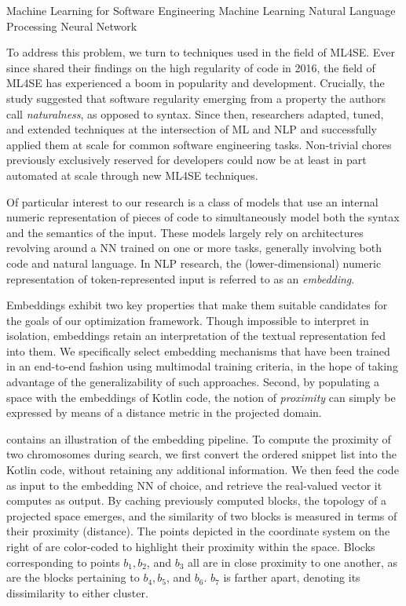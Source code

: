  {Machine Learning for Software Engineering}
 {Machine Learning}
 {Natural Language Processing}
 {Neural Network}

To address this problem, we turn to techniques used in the field
of \Gls{ML4SE}.
Ever since \citet{hindle2016naturalness} shared their findings on the
high regularity of code in 2016, the field of \gls{ML4SE} has experienced a boom
in popularity and development.
Crucially, the study suggested that software regularity 
emerging from a property the authors call \textit{naturalness}, as opposed to syntax.
Since then, researchers adapted, tuned, and extended techniques
at the intersection of \gls{ML} and \gls{NLP} and successfully applied
them at scale for common software engineering tasks.
Non-trivial chores previously exclusively reserved for developers could now
be at least in part automated at scale through new \gls{ML4SE} techniques.

Of particular interest to our research is a class of models
that use an internal numeric representation of pieces of code
to simultaneously model both the syntax and the semantics of the input.
These models largely rely on architectures revolving around a \gls{NN}
trained on one or more tasks, generally involving both code and natural language.
In \gls{NLP} research, the (lower-dimensional) numeric representation of token-represented
input is referred to as an \textit{embedding}.

Embeddings exhibit two key properties that make them suitable candidates for the goals
of our optimization framework.
Though impossible to interpret in isolation, embeddings retain
an interpretation of the textual representation fed into them.
We specifically select embedding mechanisms that have been trained
in an end-to-end fashion using multimodal training criteria, in the hope
of taking advantage of the generalizability of such approaches.
Second, by populating a space with the embeddings of Kotlin code,
the notion of \textit{proximity} can simply be expressed by means
of a distance metric in the projected domain.



 contains an illustration of the embedding pipeline.
To compute the proximity of two chromosomes during search,
we first convert the ordered snippet list into the
Kotlin code, without retaining any additional information.
We then feed the code as input to the embedding \gls{NN} of choice,
and retrieve the real-valued vector it computes as output.
By caching previously computed blocks, the topology
of a projected space emerges, and the similarity of two blocks
is measured in terms of their proximity (distance).
The points depicted in the coordinate system on the right
of  are color-coded to highlight their
proximity within the space.
Blocks corresponding to points $b_1, b_2$, and $b_3$ all
are in close proximity to one another, as are the blocks
pertaining to $b_4, b_5$, and $b_6$. 
$b_7$ is farther apart, denoting its dissimilarity to either cluster.

